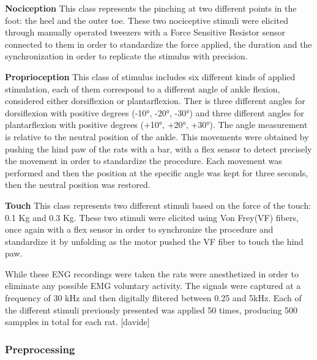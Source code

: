 \documentclass{Configuration_Files/PoliMi3i_thesis}
\begin{document}
\textbf{Nociception} \quad This class represents the pinching at two different points in the foot: the heel and the outer toe.
These two nociceptive stimuli were elicited through manually operated tweezers with a Force Sensitive Resistor sensor connected to them in order to standardize the force applied, the duration and the synchronization in order to replicate the stimulus with precision.

\textbf{Proprioception} \quad This class of stimulus includes six different kinds of applied stimulation, each of them correspond to a different angle of ankle flexion, considered either dorsiflexion or plantarflexion.
Ther is three different angles for dorsiflexion with positive degrees (-10°, -20°, -30°) and three different angles for plantarflexion with positive degrees (+10°, +20°, +30°).
The angle measurement is relative to the neutral position of the ankle.
This movements were obtained by pushing the hind paw of the rats with a bar, with a flex sensor to detect precisely the movement in order to standardize the procedure.
Each movement was performed and then the position at the specific angle was kept for three seconds, then the neutral position was restored.

\textbf{Touch} \quad This class represents two different stimuli based on the force of the touch: 0.1 Kg and 0.3 Kg.
These two stimuli were elicited using Von Frey(VF) fibers, once again with a flex sensor in order to synchronize the procedure and standardize it by unfolding as the motor pushed the VF fiber to touch the hind paw.

While these ENG recordings were taken the rats were anesthetized in order to eliminate any possible EMG voluntary activity. The signals were captured at a frequency of 30 kHz and then digitally flitered between 0.25 and 5kHz.
Each of the different stimuli previously presented was applied 50 times, producing 500 sampples in total for each rat. [davide]

\subsubsection{Preprocessing}
\end{document}
